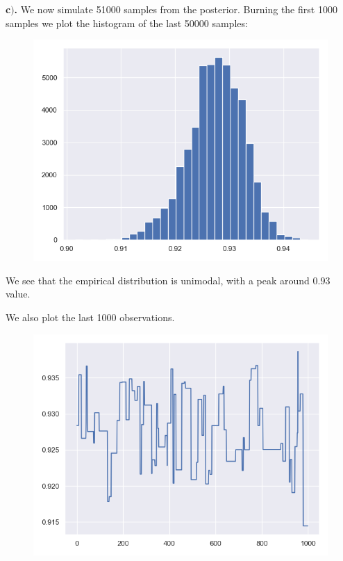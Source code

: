 \documentclass[a4 paper]{article}
\begin{document}
\textbf{c$)$.} We now simulate 
51000 samples from the posterior. 
Burning the first 1000 samples
we plot the histogram of the last 50000 samples:

\begin{figure}[H]
	\includegraphics[scale=0.4]{q1a}
	\centering
	\label{q1a}
\end{figure}

We see that the empirical distribution 
is unimodal, with a peak around $0.93$ value.
 
We also plot the last 1000 observations.

\begin{figure}[H]
	\includegraphics[scale=0.4]{q1b}
	\centering
	\label{q1b}
\end{figure}
\end{document}

